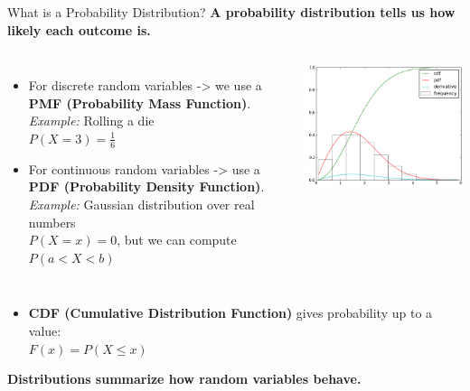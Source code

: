 \documentclass[handout,aspectratio=169]{beamer}
\begin{document}
\begin{frame}{What is a Probability Distribution?}
	\textbf{A probability distribution tells us how likely each outcome is.}
	\begin{columns}
		\begin{itemize}
			\item For discrete random variables -> we use a \textbf{PMF (Probability Mass Function)}. \textit{Example:} Rolling a die \\
			      \quad $P(X=3) = \frac{1}{6}$
			\item For continuous random variables -> use a \textbf{PDF (Probability Density Function)}. \textit{Example:} Gaussian distribution over real numbers\\
			      \quad $P(X = x) = 0$, but we can compute $P(a < X < b)$
			                      
		\end{itemize}
		              
		\includegraphics[width=\linewidth]{figs/probability_distribution.png}
	\end{columns}
	    
	\begin{itemize}
		\item \textbf{CDF (Cumulative Distribution Function)} gives probability up to a value:\\
		      \quad $F(x) = P(X \leq x)$
	\end{itemize}
	\vspace{0.5em}
	\textbf{Distributions summarize how random variables behave.}
\end{frame}
\end{document}
